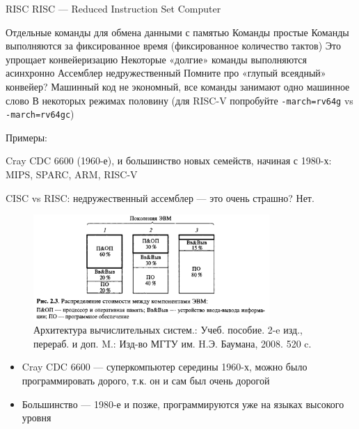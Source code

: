 \documentclass[xetex,aspectratio=43]{beamer}
\begin{document}
\begin{frame}[fragile]{RISC}
    RISC — Reduced Instruction Set Computer

    \begin{outline}[itemize]
        \1 Отдельные команды для обмена данными с памятью
        \1 Команды простые
            \2 Команды выполняются за фиксированное время (фиксированное количество тактов)
            \2 Это упрощает конвейеризацию
        \1 Некоторые «долгие» команды выполняются асинхронно
        \1 Ассемблер недружественный
            \2 Помните про «глупый всеядный» конвейер?
        \1 Машинный код не экономный, все команды занимают одно машинное слово
            \2 В некоторых режимах половину (для RISC-V попробуйте \texttt{-march=rv64g} vs \texttt{-march=rv64gc})
    \end{outline}

    Примеры:

    Cray CDC 6600 (1960-е), и большинство новых семейств, начиная с 1980-х: MIPS, SPARC, ARM, RISC-V
\end{frame}

\begin{frame}{CISC vs RISC: недружественный ассемблер --- это очень страшно?}
    \pause
    \alert{Нет.}
    \begin{figure}
        \includegraphics[width=0.8\textwidth]{img/11.generation_prices.png}
        \caption{Архитектура вычислительных систем.: Учеб. пособие. 2-e изд., перераб. и доп. M.: Изд-во МГТУ им. H.Э. Баумана, 2008. 520 c.}
    \end{figure}

    \begin{itemize}
        \item Cray CDC 6600 --- суперкомпьютер середины 1960-х, можно было программировать дорого, т.к. он и сам был очень дорогой
        \item Большинство --- 1980-е и позже, программируются уже на языках высокого уровня
    \end{itemize}
\end{frame}
\end{document}
